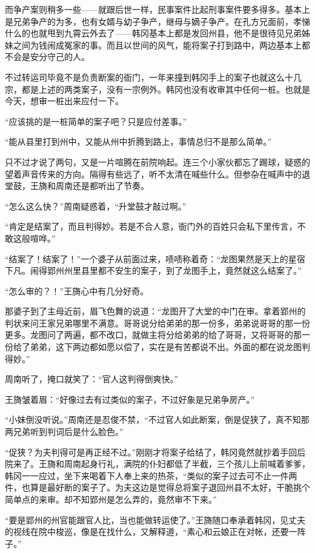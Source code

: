 而争产案则稍多一些——就跟后世一样，民事案件比起刑事案件要多得多。基本上是兄弟争产的为多，也有女婿与幼子争产，继母与嫡子争产。在孔方兄面前，孝悌什么的也就甩到九霄云外去了——韩冈基本上都是发回州县，他不是很待见兄弟姊妹之间为钱闹成冤家的事。而且以世间的风气，能将案子打到路中，两边基本上都不会是安分守己的人。

不过转运司毕竟不是负责断案的衙门，一年来撞到韩冈手上的案子也就这么十几宗，都是上述的两类案子，没有一宗例外。韩冈也没有收审其中任何一桩。也就是今天，想审一桩出来应付一下。

“应该挑的是一桩简单的案子吧？只是应付差事。”

“能从县里打到州中，又能从州中折腾到路上，事情总归不是那么简单。”

只不过才说了两句，又是一片喧腾在前院响起。连三个小家伙都忘了踢球，疑惑的望着声音传来的方向。隔得有些远了，听不太清在喊些什么。但参杂在喊声中的退堂鼓，王旖和周南还是都听出了节奏。

“怎么这么快？”周南疑惑着，“升堂鼓才敲过啊。”

“肯定是结案了，而且判得妙。若是不合人意，衙门外的百姓只会私下里传言，不敢这般喧哗。”

“结案了！结案了！”一个婆子从前面过来，啧啧称着奇：“龙图果然是天上的星宿下凡。闹得郢州州里县里都不安生的案子，到了龙图手上，竟然就这么结案了。”

“怎么审的？！”王旖心中有几分好奇。

那婆子到了主母近前，眉飞色舞的说道：“龙图开了大堂的中门在审。拿着郢州的判状来问王家兄弟哪里不满意。哥哥说分给弟弟的那一份多，弟弟说哥哥的那一份更多。龙图问了两遍，都不改口，就做主将分给弟弟的给了哥哥，又将哥哥的那一份给了弟弟，这下两边都如愿以偿了，实在是有苦都说不出。外面的都在说龙图判得妙。”

周南听了，掩口就笑了：“官人这判得倒爽快。”

王旖皱着眉：“好像过去有过类似的案子，不过好象是兄弟争房产。”

“小妹倒没听说。”周南还是忍俊不禁，“不过官人如此断案，倒是促狭了，真不知那两兄弟听到判词后是什么脸色。”

“促狭？为夫判得可是再正经不过。”刚刚才将案子给结了，韩冈竟然就抄着手回后院来了。王旖和周南起身行礼，满院的仆妇都低了半截，三个孩儿上前喊着爹爹，韩冈一一应过，坐下来喝着下人奉上来的热茶，“类似的案子过去可不止一件两件，也算是最好断的案子了。为夫这边是觉得总将案子退回州县不太好，干脆挑个简单点的来审。却不知郢州是怎么弄的，竟然审不下来。”

“要是郢州的州官能跟官人比，当也能做转运使了。”王旖随口奉承着韩冈，见丈夫的视线在院中梭巡，像是在找什么，又解释道，“素心和云娘正在对帐，还要一阵子。”

